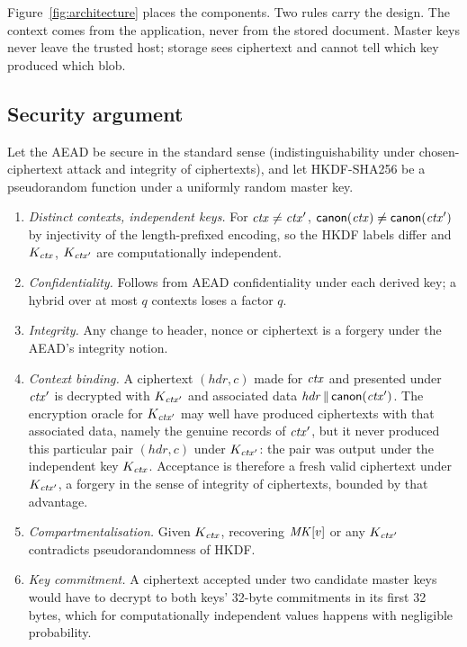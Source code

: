 Figure~\ref{fig:architecture} places the components. Two rules carry the design. The context comes from the application, never from the stored document. Master keys never leave the trusted host; storage sees ciphertext and cannot tell which key produced which blob.

\subsection{Security argument}
\label{sec:security}

Let the AEAD be secure in the standard sense (indistinguishability under chosen-ciphertext attack and integrity of ciphertexts), and let HKDF-SHA256 be a pseudorandom function under a uniformly random master key.

\begin{enumerate}
  \item \emph{Distinct contexts, independent keys.} For $\mathit{ctx} \neq \mathit{ctx}'$, $\mathsf{canon}(\mathit{ctx}) \neq \mathsf{canon}(\mathit{ctx}')$ by injectivity of the length-prefixed encoding, so the HKDF labels differ and $K_{\mathit{ctx}}$, $K_{\mathit{ctx}'}$ are computationally independent.
  \item \emph{Confidentiality.} Follows from AEAD confidentiality under each derived key; a hybrid over at most $q$ contexts loses a factor $q$.
  \item \emph{Integrity.} Any change to header, nonce or ciphertext is a forgery under the AEAD's integrity notion.
  \item \emph{Context binding.} A ciphertext $(\mathit{hdr}, c)$ made for $\mathit{ctx}$ and presented under $\mathit{ctx}'$ is decrypted with $K_{\mathit{ctx}'}$ and associated data $\mathit{hdr} \,\|\, \mathsf{canon}(\mathit{ctx}')$. The encryption oracle for $K_{\mathit{ctx}'}$ may well have produced ciphertexts with that associated data, namely the genuine records of $\mathit{ctx}'$, but it never produced this particular pair $(\mathit{hdr}, c)$ under $K_{\mathit{ctx}'}$: the pair was output under the independent key $K_{\mathit{ctx}}$. Acceptance is therefore a fresh valid ciphertext under $K_{\mathit{ctx}'}$, a forgery in the sense of integrity of ciphertexts, bounded by that advantage.
  \item \emph{Compartmentalisation.} Given $K_{\mathit{ctx}}$, recovering $\mathit{MK}[v]$ or any $K_{\mathit{ctx}'}$ contradicts pseudorandomness of HKDF.
  \item \emph{Key commitment.} A ciphertext accepted under two candidate master keys would have to decrypt to both keys' 32-byte commitments in its first 32 bytes, which for computationally independent values happens with negligible probability.
\end{enumerate}

